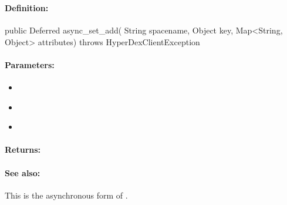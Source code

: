 \pagebreak
\subsubsection{}
\label{api:java:async_set_add}


\paragraph{Definition:}
\begin{javacode}
public Deferred async_set_add(
        String spacename,
        Object key,
        Map<String, Object> attributes) throws HyperDexClientException
\end{javacode}

\paragraph{Parameters:}
\begin{itemize}[noitemsep]
\item {}\\

\item {}\\

\item {}\\

\end{itemize}

\paragraph{Returns:}


\paragraph{See also:}  This is the asynchronous form of .

\pagebreak
\subsubsection{}
\label{api:java:cond_set_add}


